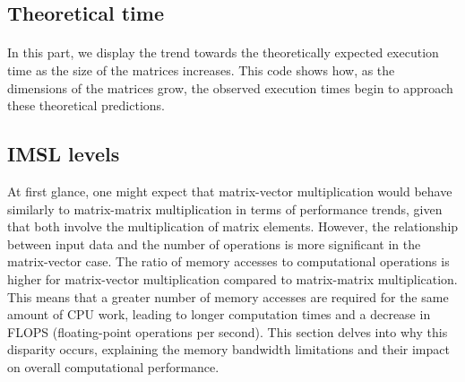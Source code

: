     \vspace*{0.5cm}

    

    \begin{figure}[h]
        \begin{center}
            
        \end{center}
        \caption{}
        \label{}
    \end{figure}


\subsection{Theoretical time}

    \paragraph*{}
    In this part, we display the trend towards the theoretically expected execution time as the size of the matrices increases. 
    This code shows how, as the dimensions of the matrices grow, the observed execution times begin to approach these theoretical 
    predictions.
    \par

    \vspace*{0.5cm}

    

    \begin{center}
        
    \end{center}


\subsection{IMSL levels}

    At first glance, one might expect that matrix-vector multiplication would behave similarly to matrix-matrix multiplication 
    in terms of performance trends, given that both involve the multiplication of matrix elements. However, the relationship 
    between input data and the number of operations is more significant in the matrix-vector case. The ratio of memory accesses 
    to computational operations is higher for matrix-vector multiplication compared to matrix-matrix multiplication. 
    This means that a greater number of memory accesses are required for the same amount of CPU work, leading to longer 
    computation times and a decrease in FLOPS (floating-point operations per second). This section delves into why this disparity 
    occurs, explaining the memory bandwidth limitations and their impact on overall computational performance.

    

      \begin{center}
          
      \end{center}
  

\newpage
